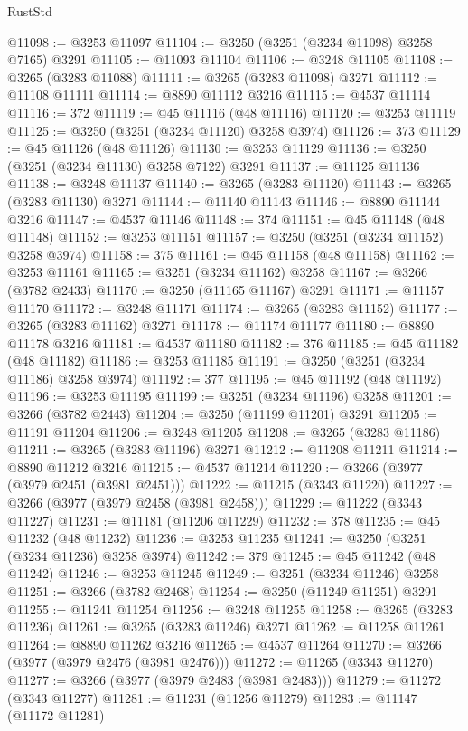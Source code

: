 \begin{lexlean}{RustStd}
\begin{coremodule}
@11098 := @3253 @11097
@11104 := @3250 (@3251 (@3234 @11098) @3258 @7165) @3291
@11105 := @11093 @11104
@11106 := @3248 @11105
@11108 := @3265 (@3283 @11088)
@11111 := @3265 (@3283 @11098) @3271
@11112 := @11108 @11111
@11114 := @8890 @11112 @3216
@11115 := @4537 @11114
@11116 := 372
@11119 := @45 @11116 (@48 @11116)
@11120 := @3253 @11119
@11125 := @3250 (@3251 (@3234 @11120) @3258 @3974)
@11126 := 373
@11129 := @45 @11126 (@48 @11126)
@11130 := @3253 @11129
@11136 := @3250 (@3251 (@3234 @11130) @3258 @7122) @3291
@11137 := @11125 @11136
@11138 := @3248 @11137
@11140 := @3265 (@3283 @11120)
@11143 := @3265 (@3283 @11130) @3271
@11144 := @11140 @11143
@11146 := @8890 @11144 @3216
@11147 := @4537 @11146
@11148 := 374
@11151 := @45 @11148 (@48 @11148)
@11152 := @3253 @11151
@11157 := @3250 (@3251 (@3234 @11152) @3258 @3974)
@11158 := 375
@11161 := @45 @11158 (@48 @11158)
@11162 := @3253 @11161
@11165 := @3251 (@3234 @11162) @3258
@11167 := @3266 (@3782 @2433)
@11170 := @3250 (@11165 @11167) @3291
@11171 := @11157 @11170
@11172 := @3248 @11171
@11174 := @3265 (@3283 @11152)
@11177 := @3265 (@3283 @11162) @3271
@11178 := @11174 @11177
@11180 := @8890 @11178 @3216
@11181 := @4537 @11180
@11182 := 376
@11185 := @45 @11182 (@48 @11182)
@11186 := @3253 @11185
@11191 := @3250 (@3251 (@3234 @11186) @3258 @3974)
@11192 := 377
@11195 := @45 @11192 (@48 @11192)
@11196 := @3253 @11195
@11199 := @3251 (@3234 @11196) @3258
@11201 := @3266 (@3782 @2443)
@11204 := @3250 (@11199 @11201) @3291
@11205 := @11191 @11204
@11206 := @3248 @11205
@11208 := @3265 (@3283 @11186)
@11211 := @3265 (@3283 @11196) @3271
@11212 := @11208 @11211
@11214 := @8890 @11212 @3216
@11215 := @4537 @11214
@11220 := @3266 (@3977 (@3979 @2451 (@3981 @2451)))
@11222 := @11215 (@3343 @11220)
@11227 := @3266 (@3977 (@3979 @2458 (@3981 @2458)))
@11229 := @11222 (@3343 @11227)
@11231 := @11181 (@11206 @11229)
@11232 := 378
@11235 := @45 @11232 (@48 @11232)
@11236 := @3253 @11235
@11241 := @3250 (@3251 (@3234 @11236) @3258 @3974)
@11242 := 379
@11245 := @45 @11242 (@48 @11242)
@11246 := @3253 @11245
@11249 := @3251 (@3234 @11246) @3258
@11251 := @3266 (@3782 @2468)
@11254 := @3250 (@11249 @11251) @3291
@11255 := @11241 @11254
@11256 := @3248 @11255
@11258 := @3265 (@3283 @11236)
@11261 := @3265 (@3283 @11246) @3271
@11262 := @11258 @11261
@11264 := @8890 @11262 @3216
@11265 := @4537 @11264
@11270 := @3266 (@3977 (@3979 @2476 (@3981 @2476)))
@11272 := @11265 (@3343 @11270)
@11277 := @3266 (@3977 (@3979 @2483 (@3981 @2483)))
@11279 := @11272 (@3343 @11277)
@11281 := @11231 (@11256 @11279)
@11283 := @11147 (@11172 @11281)

\end{coremodule}
\end{lexlean}
